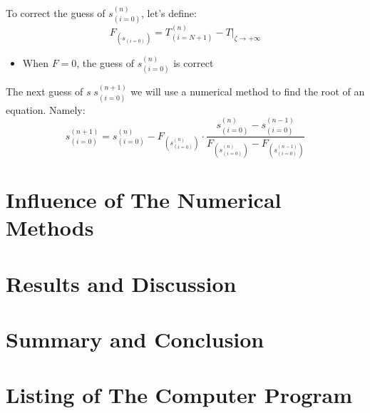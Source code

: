 \documentclass[11pt, a4paper]{article}
\begin{document}
To correct the guess of $s_{(i=0)}^{(n)}$, let's define:
\begin{equation}
    F_{\left(s_{(i=0)}\right)}=T^{(n)}_{(i=N+1)}-\left.T\right|_{\zeta\rightarrow+\infty}
\end{equation}
\begin{itemize}
    \item When $F=0$, the guess of $s_{(i=0)}^{(n)}$ is correct
\end{itemize}
The next guess of \emph{s} $s_{(i=0)}^{(n+1)}$ we will use a numerical method to find the root of an equation. Namely:
\begin{equation}
    s_{(i=0)}^{(n+1)}=s_{(i=0)}^{(n)}-F_{\left(s_{(i=0)}^{(n)}\right)}\cdot\frac{s_{(i=0)}^{(n)}-s_{(i=0)}^{(n-1)}}{F_{\left(s_{(i=0)}^{(n)}\right)}-F_{\left(s_{(i=0)}^{(n-1)}\right)}}
\end{equation}

\section{Influence of The Numerical Methods}

\section{Results and Discussion}

\section{Summary and Conclusion}

\newpage
\appendix
\section{Listing of The Computer Program}
\end{document}
